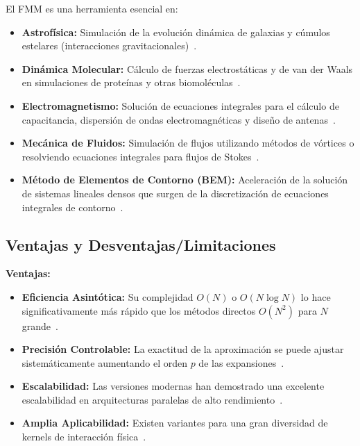 El FMM es una herramienta esencial en:
\begin{itemize}
    \item \textbf{Astrofísica:} Simulación de la evolución dinámica de galaxias y cúmulos estelares (interacciones gravitacionales)~\cite{Dehnen2002, Cipra2000}.
    \item \textbf{Dinámica Molecular:} Cálculo de fuerzas electrostáticas y de van der Waals en simulaciones de proteínas y otras biomoléculas~\cite{BeatsonGreengard1997}.
    \item \textbf{Electromagnetismo:} Solución de ecuaciones integrales para el cálculo de capacitancia, dispersión de ondas electromagnéticas y diseño de antenas~\cite{ChengEtAl1999, Martinsson2012}.
    \item \textbf{Mecánica de Fluidos:} Simulación de flujos utilizando métodos de vórtices o resolviendo ecuaciones integrales para flujos de Stokes~\cite{BeatsonGreengard1997}.
    \item \textbf{Método de Elementos de Contorno (BEM):} Aceleración de la solución de sistemas lineales densos que surgen de la discretización de ecuaciones integrales de contorno~\cite{ChenSF, Martinsson2012}.
\end{itemize}

\subsection{Ventajas y Desventajas/Limitaciones}

\textbf{Ventajas:}
\begin{itemize}
    \item \textbf{Eficiencia Asintótica:} Su complejidad $O(N)$ o $O(N \log N)$ lo hace significativamente más rápido que los métodos directos $O(N^2)$ para $N$ grande~\cite{GreengardRokhlin1987}.
    \item \textbf{Precisión Controlable:} La exactitud de la aproximación se puede ajustar sistemáticamente aumentando el orden $p$ de las expansiones~\cite{BeatsonGreengard1997}.
    \item \textbf{Escalabilidad:} Las versiones modernas han demostrado una excelente escalabilidad en arquitecturas paralelas de alto rendimiento~\cite{YokotaBarba2012}.
    \item \textbf{Amplia Aplicabilidad:} Existen variantes para una gran diversidad de kernels de interacción física~\cite{Martinsson2012}.
\end{itemize}

